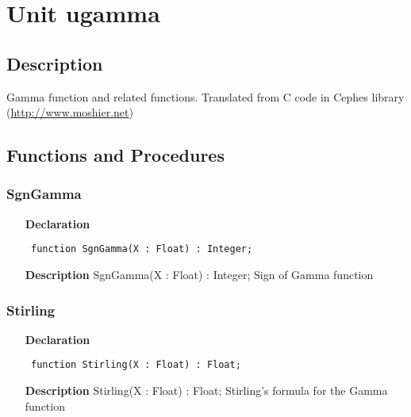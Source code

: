 \documentclass[12pt,a4paper,oneside]{report}
\newcommand{\declarationitem}[1]{\textbf{#1}}
\newcommand{\descriptiontitle}[1]{\textbf{#1}}
\newcommand{\code}[1]{\texttt{#1}}
\begin{document}
\section{Unit ugamma}
\label{ugamma}
\subsection{Description}
Gamma function and related functions. Translated from C code in Cephes library (\href{http://www.moshier.net}{http://www.moshier.net}) \subsection{Functions and Procedures}
\subsubsection{SgnGamma}
\label{ugamma-SgnGamma}
\begin{itemize}\item[\declarationitem{Declaration}\hfill]
	\begin{flushleft}
		\code{
			function SgnGamma(X : Float) : Integer;}
		
	\end{flushleft}
	
	\par
	\item[\descriptiontitle{Description}]
	SgnGamma(X : Float) : Integer; Sign of Gamma function
	
\end{itemize}
\subsubsection{Stirling}
\label{ugamma-Stirling}
\begin{itemize}\item[\declarationitem{Declaration}\hfill]
	\begin{flushleft}
		\code{
			function Stirling(X : Float) : Float;}
		
	\end{flushleft}
	
	\par
	\item[\descriptiontitle{Description}]
	Stirling(X : Float) : Float; Stirling's formula for the Gamma function
	
\end{itemize}
\end{document}
